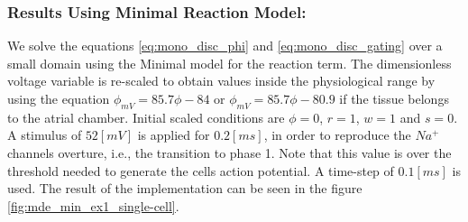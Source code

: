 \subsubsection{Results Using Minimal Reaction Model:}

We solve the equations \eqref{eq:mono_disc_phi} and \eqref{eq:mono_disc_gating} over a small domain using the Minimal model for the reaction term. The dimensionless voltage variable is re-scaled to obtain values inside the physiological range by using the equation $\phi_{mV} = 85.7 \phi - 84$ or $\phi_{mV} = 85.7 \phi - 80.9$ if the tissue belongs to the atrial chamber. Initial scaled conditions are $\phi = 0$, $r = 1$, $w = 1$ and $s = 0$. A stimulus of $52 [mV]$ is applied for $0.2 [ms]$, in order to reproduce the $Na^+$ channels overture, i.e., the transition to phase 1. Note that this value is over the threshold needed to generate the cells action potential. A time-step of $0.1 [ms]$ is used. The result of the implementation can be seen in the figure \ref{fig:mde_min_ex1_single-cell}.

